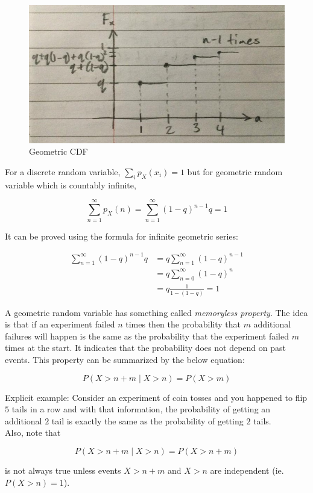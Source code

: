 \documentclass[12pt, a4paper]{article}
\newcounter{exa}
\begin{document}
\begin{figure}[H]
\centering
\includegraphics[width=120mm]{8.jpg}
\caption{Geometric CDF}
\end{figure}

For a discrete random variable, $\sum_i p_X (x_i)=1$ but for geometric random variable which is countably infinite,

$$\sum_{n=1}^\infty p_X(n) = \sum_{n=1}^\infty (1-q)^{n-1} q = 1$$

It can be proved using the formula for infinite geometric series:

\begin{align*}
\sum_{n=1}^\infty (1-q)^{n-1} q &= q \sum_{n=1}^\infty (1-q)^{n-1} \\
&= q \sum_{n=0}^\infty (1-q)^{n} \\
&= q\frac{1}{1-(1-q)} = 1
\end{align*}

A geometric random variable has something called \textit{memoryless property}. The idea is that if an experiment failed $n$ times then the probability that $m$ additional failures will happen is the same as the probability that the experiment failed $m$ times at the start. It indicates that the probability does not depend on past events. This property can be summarized by the below equation:

$$P(X>n+m\mid X>n)=P(X>m)$$

Explicit example: Consider an experiment of coin tosses and you happened to flip $5$ tails in a row and with that information, the probability of getting an additional $2$ tail is exactly the same as the probability of getting $2$ tails. \\

Also, note that

$$P(X>n+m\mid X>n)=P(X>n+m)$$

is not always true unless events $X>n+m$ and $X>n$ are independent (ie. $P(X>n)=1$). \\
\end{document}
